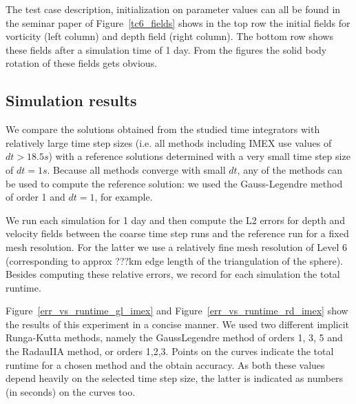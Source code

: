 \documentclass[a4paper, 12pt]{article}
\newcommand{\checkit}[1]{{\color{red}#1}}
\begin{document}
The test case description, initialization on parameter values can all be found in the seminar paper of
 Figure~\ref{tc6_fields} shows in the top row the initial fields for vorticity (left column) and depth field (right column). The bottom row shows these fields after a simulation time of 1 day. From the figures the solid body rotation of these fields gets obvious.





\subsection{Simulation results}

We compare the solutions obtained from the studied time integrators with relatively
large time step sizes (i.e. all methods including IMEX use values of $dt >18.5s$) with a reference solutions determined with a very small time step size of $dt=1s$. Because all methods converge with small
$dt$, any of the methods can be used to compute the reference solution: we used the Gauss-Legendre method of order 1 and $dt=1$, for example.

We run each simulation for 1 day and then compute the L2 errors for depth and velocity fields between the coarse time step runs and the reference run for a fixed mesh resolution. For the latter we use a relatively fine mesh resolution of Level 6 (corresponding to approx ???km edge length of the triangulation of the sphere). Besides computing these relative errors, we record for each simulation the total runtime.

Figure~\ref{err_vs_runtime_gl_imex} and Figure~\ref{err_vs_runtime_rd_imex} show the results of this experiment in a concise manner. We used two different implicit Runga-Kutta methods, namely the GaussLegendre method of orders \checkit{1, 3, 5 and the RadauIIA method, or orders 1,2,3}. Points on the curves indicate the total runtime for a chosen method and the obtain accuracy. As both these values depend heavily on the selected time step size, the latter is indicated as numbers (in seconds) on the curves too.
\end{document}
